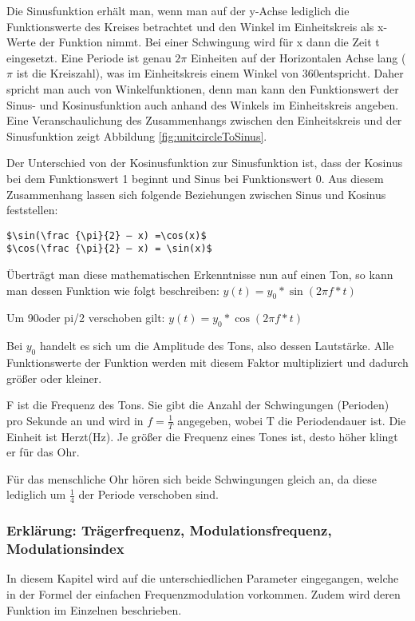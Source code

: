 Die Sinusfunktion erhält man, wenn man auf der y-Achse lediglich die Funktionswerte des Kreises betrachtet und den Winkel im Einheitskreis als x-Werte der Funktion nimmt. Bei einer Schwingung wird für x dann die Zeit t eingesetzt. Eine Periode ist genau $2\pi$ Einheiten auf der Horizontalen Achse lang ($\pi$ ist die Kreiszahl), was im Einheitskreis einem Winkel von 360\degree entspricht. Daher spricht man auch von Winkelfunktionen, denn man kann den Funktionswert der Sinus- und Kosinusfunktion auch anhand des Winkels im Einheitskreis angeben. 
Eine Veranschaulichung des Zusammenhangs zwischen den Einheitskreis und der Sinusfunktion zeigt Abbildung \ref{fig:unitcircleToSinus}.

Der Unterschied von der Kosinusfunktion zur Sinusfunktion ist, dass der Kosinus bei dem Funktionswert 1 beginnt und Sinus bei Funktionswert 0. Aus diesem Zusammenhang lassen sich folgende Beziehungen zwischen Sinus und Kosinus feststellen:\\

\begin{lstlisting}[mathescape]
$\sin(\frac {\pi}{2} – x) =\cos(x)$
$\cos(\frac {\pi}{2} – x) = \sin(x)$
\end{lstlisting}

Überträgt man diese mathematischen Erkenntnisse nun auf einen Ton, so kann man dessen Funktion wie folgt beschreiben: 		$y(t) = y_0 * \sin(2 \pi f * t)$

Um 90\degree oder pi/2 verschoben gilt: 		$y(t) = y_0*\cos(2 \pi f*t)$

Bei $y_0$ handelt es sich um die Amplitude des Tons, also dessen Lautstärke. Alle Funktionswerte der Funktion werden mit diesem Faktor multipliziert und dadurch größer oder kleiner.

F ist die Frequenz des Tons. Sie gibt die Anzahl der Schwingungen (Perioden) pro Sekunde an und wird in $f=\frac{1}{T}$ angegeben, wobei T die Periodendauer ist. Die Einheit ist Herzt(Hz).
Je größer die Frequenz eines Tones ist, desto höher klingt er für das Ohr.

Für das menschliche Ohr hören sich beide Schwingungen gleich an, da diese lediglich um $\frac{1}{4}$ der Periode verschoben sind. 

\subsubsection{Erklärung: Trägerfrequenz, Modulationsfrequenz, Modulationsindex}

In diesem Kapitel wird auf die unterschiedlichen Parameter eingegangen, welche in der Formel der einfachen Frequenzmodulation vorkommen. Zudem wird deren Funktion im Einzelnen beschrieben.

